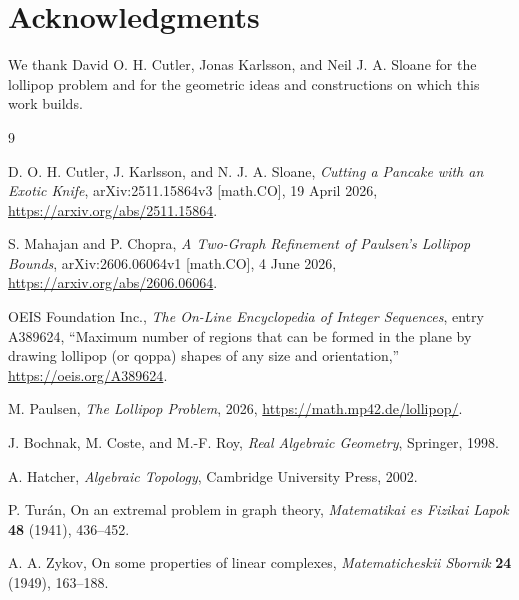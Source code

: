 \documentclass[11pt]{article}
\theoremstyle{plain}
\theoremstyle{definition}
\theoremstyle{remark}
\newcommand{\1}{\mathbf 1}
\begin{document}
\section*{Acknowledgments}

We thank David O. H. Cutler, Jonas Karlsson, and Neil J. A. Sloane for the
lollipop problem and for the geometric ideas and constructions on which this
work builds.

\clearpage
\begingroup
\small
\begin{thebibliography}{9}

D. O. H. Cutler, J. Karlsson, and N. J. A. Sloane,
\emph{Cutting a Pancake with an Exotic Knife},
arXiv:2511.15864v3 [math.CO], 19 April 2026,
\url{https://arxiv.org/abs/2511.15864}.

S. Mahajan and P. Chopra,
\emph{A Two-Graph Refinement of Paulsen's Lollipop Bounds},
arXiv:2606.06064v1 [math.CO], 4 June 2026,
\url{https://arxiv.org/abs/2606.06064}.

OEIS Foundation Inc.,
\emph{The On-Line Encyclopedia of Integer Sequences}, entry A389624,
``Maximum number of regions that can be formed in the plane by drawing
lollipop (or qoppa) shapes of any size and orientation,''
\url{https://oeis.org/A389624}.

M. Paulsen,
\emph{The Lollipop Problem}, 2026,
\url{https://math.mp42.de/lollipop/}.

J. Bochnak, M. Coste, and M.-F. Roy,
\emph{Real Algebraic Geometry}, Springer, 1998.

A. Hatcher,
\emph{Algebraic Topology}, Cambridge University Press, 2002.

P. Tur\'an,
On an extremal problem in graph theory,
\emph{Matematikai es Fizikai Lapok} \textbf{48} (1941), 436--452.

A. A. Zykov,
On some properties of linear complexes,
\emph{Matematicheskii Sbornik} \textbf{24} (1949), 163--188.

\end{thebibliography}
\endgroup
\end{document}
